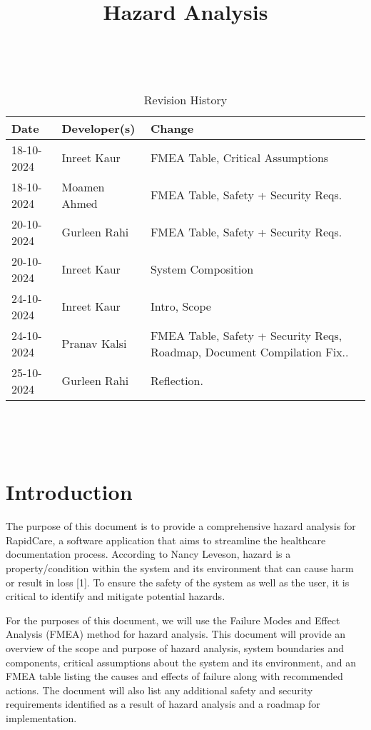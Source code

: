 \documentclass{article}
\title{Hazard Analysis\\\progname}
\author{\authname}
\date{}
\begin{document}
\maketitle
\thispagestyle{empty}

~\newpage


\begin{table}[hp]
\caption{Revision History} \label{TblRevisionHistory}
\begin{tabularx}{\textwidth}{llX}
\toprule
\textbf{Date} & \textbf{Developer(s)} & \textbf{Change}\\
\midrule
18-10-2024 & Inreet Kaur & FMEA Table, Critical Assumptions\\
18-10-2024 & Moamen Ahmed & FMEA Table, Safety + Security Reqs.\\
20-10-2024 & Gurleen Rahi & FMEA Table, Safety + Security Reqs.\\
20-10-2024 & Inreet Kaur & System Composition\\
24-10-2024 & Inreet Kaur & Intro, Scope\\
24-10-2024 & Pranav Kalsi & FMEA Table, Safety + Security Reqs, Roadmap, Document Compilation Fix..\\
25-10-2024 & Gurleen Rahi & Reflection.\\
\bottomrule
\end{tabularx}
\end{table}

~\newpage

\tableofcontents

~\newpage



\section{Introduction}

The purpose of this document is to provide a comprehensive hazard analysis for RapidCare, a software application that aims to streamline the healthcare documentation process. According to Nancy Leveson, hazard is a property/condition within the system and its environment that can cause harm or result in loss [1]. To ensure the safety of the system as well as the user, it is critical to identify and mitigate potential hazards.

For the purposes of this document, we will use the Failure Modes and Effect Analysis (FMEA) method for hazard analysis. This document will provide an overview of the scope and purpose of hazard analysis, system boundaries and components, critical assumptions about the system and its environment, and an FMEA table listing the causes and effects of failure along with recommended actions. The document will also list any additional safety and security requirements identified as a result of hazard analysis and a roadmap for implementation.
\end{document}
